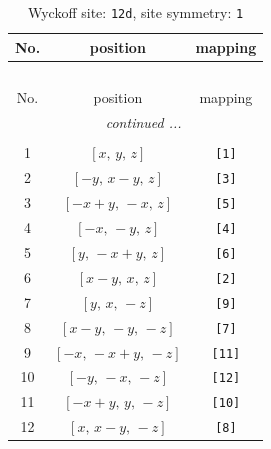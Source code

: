 \documentclass[fleqn,8pt]{jsarticle}
\begin{document}
\renewcommand{\arraystretch}{1.2}
\begin{longtable}{ccc}
\caption{Wyckoff site: {\tt 12d}, site symmetry: {\tt 1}}
 \\
 \hline \hline
No. & position & mapping \\ \hline \endfirsthead

\multicolumn{2}{l}{\tablename\ \thetable{}} \\
 \hline \hline
No. & position & mapping \\ \hline \endhead

 \hline \hline
\multicolumn{2}{r}{\footnotesize\it continued ...} \\ \endfoot

 \hline \hline
\multicolumn{2}{r}{} \\ \endlastfoot

1 & $\left[ x,\, y,\, z \right]$ & {\tt [1]} \\ \hline
2 & $\left[ - y,\, x - y,\, z \right]$ & {\tt [3]} \\ \hline
3 & $\left[ - x + y,\, - x,\, z \right]$ & {\tt [5]} \\ \hline
4 & $\left[ - x,\, - y,\, z \right]$ & {\tt [4]} \\ \hline
5 & $\left[ y,\, - x + y,\, z \right]$ & {\tt [6]} \\ \hline
6 & $\left[ x - y,\, x,\, z \right]$ & {\tt [2]} \\ \hline
7 & $\left[ y,\, x,\, - z \right]$ & {\tt [9]} \\ \hline
8 & $\left[ x - y,\, - y,\, - z \right]$ & {\tt [7]} \\ \hline
9 & $\left[ - x,\, - x + y,\, - z \right]$ & {\tt [11]} \\ \hline
10 & $\left[ - y,\, - x,\, - z \right]$ & {\tt [12]} \\ \hline
11 & $\left[ - x + y,\, y,\, - z \right]$ & {\tt [10]} \\ \hline
12 & $\left[ x,\, x - y,\, - z \right]$ & {\tt [8]} \\
\end{longtable}
\end{document}
